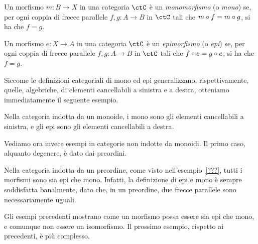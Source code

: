 \begin{definition}[Monomorfismo]\label{def_Mono}
	Un morfismo \(m \colon B \to X\) in una categoria \(\ctC\) è un \emph{monomorfismo} (o \emph{mono}) se,
	per ogni coppia di frecce parallele \(f, g \colon A \to B\) in \(\ctC\) tali che \(m \circ f = m \circ g\), si ha che \(f = g\).
\end{definition}

\begin{definition}[Epimorfismo]\label{def_Epi}
	Un morfismo \(e \colon X \to A\) in una categoria \(\ctC\) è un \emph{epimorfismo} (o \emph{epi}) se,
	per ogni coppia di frecce parallele \(f, g \colon A \to B\) in \(\ctC\) tali che \(f \circ e = g \circ e\), si ha che \(f = g\).
\end{definition}

Siccome le definizioni categoriali di mono ed epi generalizzano, rispettivamente, quelle, algebriche, di elementi cancellabili a sinistra e a destra,
otteniamo immediatamente il seguente esempio.

\begin{example}
	Nella categoria indotta da un monoide, i mono sono gli elementi cancellabili a sinistra,
	e gli epi sono gli elementi cancellabili a destra.
\end{example}

Vediamo ora invece esempi in categorie non indotte da monoidi.
Il primo caso, alquanto degenere, è dato dai preordini. 

\begin{example}
	Nella categoria indotta da un preordine, come visto nell'esempio~\ref{???},
	tutti i morfismi sono sia epi che mono.
	Infatti, la definizione di epi e mono è sempre soddisfatta banalmente,
	dato che, in un preordine, due frecce parallele sono necessariamente uguali.
\end{example}

Gli esempi precedenti mostrano come
un morfismo possa essere sia epi che mono, e comunque non essere un isomorfismo.
Il prossimo esempio, rispetto ai precedenti, è più complesso.

